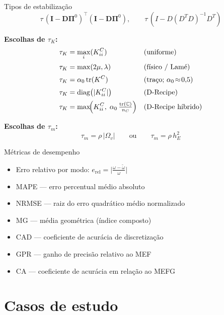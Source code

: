 \documentclass[aspectratio=169]{beamer}
\begin{document}
{\begin{frame}{Tipos de estabilização}
  \[ \tau \,(\mathbf{I}-\mathbf{D}\boldsymbol{\Pi}^0)^\top
      (\mathbf{I}-\mathbf{D}\boldsymbol{\Pi}^0),
    \qquad \tau \,(I - D (D^T D)^{-1} D^T)
  \]

  \vspace{0.15em}
  \textbf{Escolhas de $\tau_K$:}
  \begin{align*}
    \tau_K &= \max_i(K^C_{ii})
      && \text{(uniforme)} \\[0.15em]
    \tau_K &= \max(2\mu,\lambda)
      && \text{(físico / Lamé)} \\[0.15em]
    \tau_K &= \alpha_0\,\mathrm{tr}(K^C)
      && \text{(traço; $\alpha_0\!\approx\!0{,}5$)} \\[0.15em]
    \tau_K &= \mathrm{diag}\bigl(|K^C_{ii}|\bigr)
      && \text{(D-Recipe)} \\[0.15em]
    \tau_K &= \max\!\Bigl(K^C_{ii},\;
      \alpha_0\,\tfrac{\mathrm{tr}(\mathbb{C})}{n_C}\Bigr)
      && \text{(D-Recipe híbrido)}
  \end{align*}

  \textbf{Escolhas de $\tau_m$:}
  \[
    \tau_m = \rho\,|\Omega_v|
    \qquad\text{ou}\qquad
    \tau_m = \rho\,h_E^2
  \]
\end{frame}


\begin{frame}{Métricas de desempenho}
  \begin{itemize}
    \item Erro relativo por modo:
      $e_{\mathrm{rel}} = \bigl|\frac{\omega-\tilde{\omega}}{\omega}\bigr|$
    \item MAPE --- erro percentual médio absoluto
    \item NRMSE --- raiz do erro quadrático médio normalizado
    \item MG --- média geométrica (índice composto)
    \item CAD --- coeficiente de acurácia de discretização
    \item GPR --- ganho de precisão relativo ao MEF
    \item CA --- coeficiente de acurácia em relação ao MEFG
  \end{itemize}
\end{frame}

\section{Casos de estudo}

}
\end{document}
